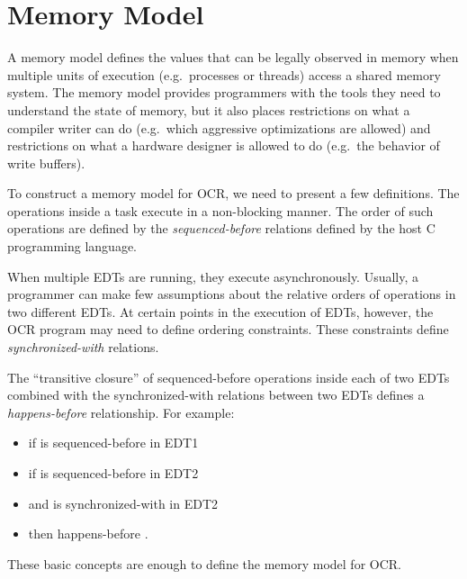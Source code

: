 %
%

%
%
%
%

\section{Memory Model}
\label{sec:MemoryModel}

A memory model defines the values that can be legally observed in
memory when multiple units of execution (e.g.\ processes or threads)
access a shared memory system. The memory model provides programmers
with the tools they need to understand the state of memory, but it
also places restrictions on what a compiler writer can do (e.g.\ which
aggressive optimizations are allowed) and restrictions on what a
hardware designer is allowed to do (e.g.\ the behavior of write
buffers).

To construct a memory model for OCR, we need to present a few
definitions. The operations inside a task execute in a non-blocking
manner. The order of such operations are defined by the
\emph{sequenced-before} relations defined by
the host C programming language.

When multiple EDTs are running, they execute asynchronously. Usually,
a programmer can make few assumptions about the relative orders of
operations in two different EDTs. At certain points in the execution
of EDTs, however, the OCR program may need to define ordering
constraints. These constraints define
\emph{synchronized-with} relations.

The ``transitive closure'' of sequenced-before operations inside each
of two EDTs combined with the synchronized-with relations between two
EDTs defines a \emph{happens-before}
relationship. For example:
\begin{itemize}
\item if  is sequenced-before  in EDT1
\item  if  is sequenced-before  in EDT2
\item and   is synchronized-with   in EDT2
\item then  happens-before .
\end{itemize}
These basic concepts are enough to define the memory model for OCR.


